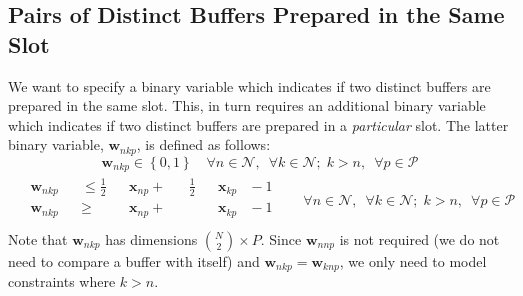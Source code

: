 \subsection{Pairs of Distinct Buffers Prepared in the Same Slot}
\label{SS.constr6}
We want to specify a binary variable which indicates if two distinct
buffers are prepared in the same slot.
This, in turn requires an additional binary variable which indicates if two
distinct buffers are prepared in a \emph{particular} slot.
The latter binary variable, $ \boldsymbol{w}_{nkp} $, is defined as follows:
\begin{equation}
    \boldsymbol{w}_{nkp} \in \left\{ 0, 1 \right\} \quad \forall n \in 
    \mathcal{N}, \enspace \forall k \in \mathcal{N}; \; k > n, \enspace 
    \forall p \in \mathcal{P}
    \label{eq.w}
\end{equation}
\begin{equation}
    \begin{split}
        \begin{alignedat}{11}
            &\boldsymbol{w}_{nkp} {}&&\le{} \tfrac{1}{2} &&\boldsymbol{x}_{np}
            {}+{} &&\tfrac{1}{2} && \boldsymbol{x}_{kp} &{}-{} 1\\
            &\boldsymbol{w}_{nkp} {}&&\ge{} &&\boldsymbol{x}_{np} {}+{} &&
            && \boldsymbol{x}_{kp} &{}-{} 1\\
        \end{alignedat}
    \end{split}
    \quad
    \begin{split}
        \forall n \in \mathcal{N}, \enspace \forall k \in \mathcal{N}; \; 
        k > n, \enspace \forall p \in \mathcal{P}
    \end{split}
    \label{eq.w1}
\end{equation}
Note that $\boldsymbol{w}_{nkp}$ has dimensions
$\binom{N}{2} \times P$.
Since $\boldsymbol{w}_{nnp}$ is
not required (we do not need to compare a buffer with itself) and
$\boldsymbol{w}_{nkp} = \boldsymbol{w}_{knp}$, we only need to model
constraints where $k > n$.

